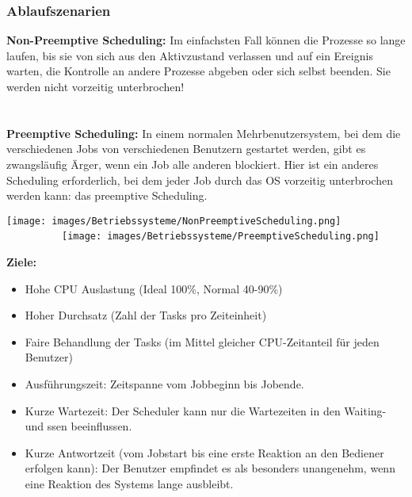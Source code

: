 \subsubsection{Ablaufszenarien}
\begin{multicols}{2}
\textbf{Non-Preemptive Scheduling:} Im einfachsten Fall können die Prozesse so lange laufen, bis sie von sich aus den Aktivzustand verlassen und auf ein Ereignis warten, die Kontrolle an andere Prozesse abgeben oder sich selbst beenden. Sie werden nicht vorzeitig unterbrochen!\\\\\\
\textbf{Preemptive Scheduling:}
In einem normalen Mehrbenutzersystem, bei dem die verschiedenen Jobs von verschiedenen Benutzern gestartet werden, gibt es zwangsläufig Ärger, wenn ein Job alle anderen blockiert. Hier ist ein anderes Scheduling erforderlich, bei dem jeder Job durch das OS vorzeitig unterbrochen werden kann: das preemptive Scheduling.
\end{multicols}
\begin{multicols}{2}
\texttt{[image: images/Betriebssysteme/NonPreemptiveScheduling.png]} \ \ \ \ \ \ \ \ \ \
\texttt{[image: images/Betriebssysteme/PreemptiveScheduling.png]}
\end{multicols}
\textbf{Ziele:}
\begin{itemize}
    \item Hohe CPU Auslastung (Ideal 100\%, Normal 40-90\%)
    \item Hoher Durchsatz (Zahl der Tasks pro Zeiteinheit)
    \item Faire Behandlung der Tasks (im Mittel gleicher CPU-Zeitanteil für jeden Benutzer)
    \item Ausführungszeit: Zeitspanne vom Jobbeginn bis Jobende.
    \item Kurze Wartezeit: Der Scheduler kann nur die Wartezeiten in den Waiting- und ssen beeinflussen.
    \item Kurze Antwortzeit (vom Jobstart bis eine erste Reaktion an den Bediener erfolgen kann): Der Benutzer empfindet es als besonders unangenehm, wenn eine Reaktion des Systems lange ausbleibt.
\end{itemize}

